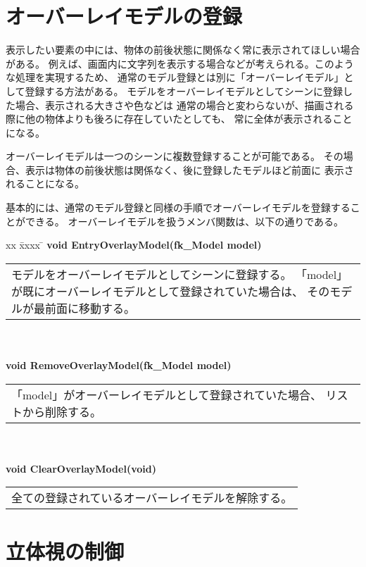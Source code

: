 \section{オーバーレイモデルの登録}

表示したい要素の中には、物体の前後状態に関係なく常に表示されてほしい場合がある。
例えば、画面内に文字列を表示する場合などが考えられる。このような処理を実現するため、
通常のモデル登録とは別に「オーバーレイモデル」として登録する方法がある。
モデルをオーバーレイモデルとしてシーンに登録した場合、表示される大きさや色などは
通常の場合と変わらないが、描画される際に他の物体よりも後ろに存在していたとしても、
常に全体が表示されることになる。

オーバーレイモデルは一つのシーンに複数登録することが可能である。
その場合、表示は物体の前後状態は関係なく、後に登録したモデルほど前面に
表示されることになる。

基本的には、通常のモデル登録と同様の手順でオーバーレイモデルを登録することができる。
オーバーレイモデルを扱うメンバ関数は、以下の通りである。
\begin{tabbing}
xx \= xxxx \= \kill
\> \textbf{void EntryOverlayModel(fk\_Model model)} \\
	\> \> \begin{tabular}{p{15cm}}
		モデルをオーバーレイモデルとしてシーンに登録する。
		「model」が既にオーバーレイモデルとして登録されていた場合は、
		そのモデルが最前面に移動する。
	\end{tabular} \\ \\

\> \textbf{void RemoveOverlayModel(fk\_Model model)} \\
	\> \> \begin{tabular}{p{15cm}}
		「model」がオーバーレイモデルとして登録されていた場合、
		リストから削除する。
	\end{tabular} \\ \\

\> \textbf{void ClearOverlayModel(void)} \\
	\> \> \begin{tabular}{p{15cm}}
		全ての登録されているオーバーレイモデルを解除する。
	\end{tabular}
\end{tabbing}

\section{立体視の制御}

